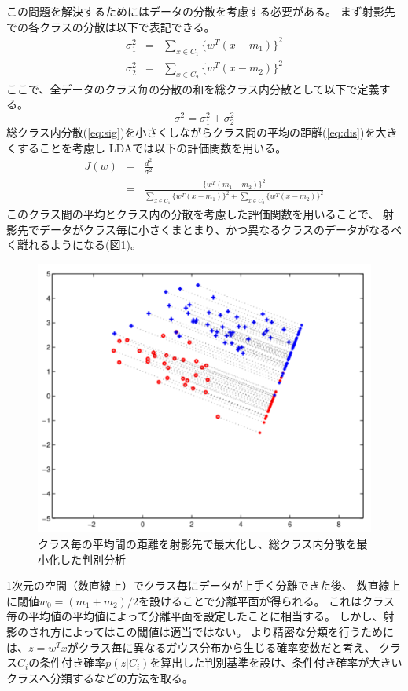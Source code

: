 この問題を解決するためにはデータの分散を考慮する必要がある。
まず射影先での各クラスの分散は以下で表記できる。
\begin{eqnarray}
    \sigma^2_{1} & = & \sum_{x\in C_1}\{w^T(x-m_1)\}^2  \\
    \sigma^2_{2} & = & \sum_{x\in C_2}\{w^T(x-m_2)\}^2
\end{eqnarray}
ここで、全データのクラス毎の分散の和を総クラス内分散として以下で定義する。
\begin{equation}
    \sigma^2  = \sigma^2_1 + \sigma^2_2
    \label{eq:sig}
\end{equation}
総クラス内分散(\ref{eq:sig})を小さくしながらクラス間の平均の距離(\ref{eq:dis})を大きくすることを考慮し
LDAでは以下の評価関数を用いる。
\begin{eqnarray}
    J(w) & = & \frac{d^2}{\sigma^2} \nonumber \\
    & = & \frac{\{w^T(m_1-m_2)\}^2}{\sum_{x\in C_1}\{w^T(x-m_1)\}^2 + \sum_{x\in C_2}\{w^T(x-m_2)\}^2}
    \label{eq:lda_obj}
\end{eqnarray}
このクラス間の平均とクラス内の分散を考慮した評価関数を用いることで、
射影先でデータがクラス毎に小さくまとまり、かつ異なるクラスのデータがなるべく離れるようになる(図\ref{fig:var_dis})。
\begin{figure}
    \centering
    \includegraphics[width=12cm]{images/var_dis.png}
    \caption{クラス毎の平均間の距離を射影先で最大化し、総クラス内分散を最小化した判別分析}
    \label{fig:var_dis}
\end{figure}

1次元の空間（数直線上）でクラス毎にデータが上手く分離できた後、
数直線上に閾値\(w_0=(m_1+m_2)/2\)を設けることで分離平面が得られる。
これはクラス毎の平均値の平均値によって分離平面を設定したことに相当する。
しかし、射影のされ方によってはこの閾値は適当ではない。
より精密な分類を行うためには、\(z=w^Tx\)がクラス毎に異なるガウス分布から生じる確率変数だと考え、
クラス\(C_i\)の条件付き確率\(p(z|C_i)\)を算出した判別基準を設け、条件付き確率が大きいクラスへ分類するなどの方法を取る。

